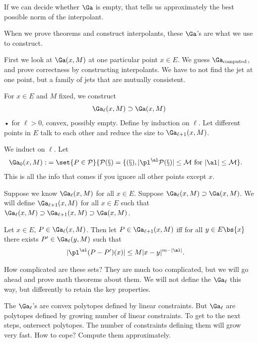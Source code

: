 If we can decide whether $\Ga$ is empty, that tells us approximately the best possible norm of the interpolant.

When we prove theorems and construct interpolants, these $\Ga$'s are what we use to construct. 

First we look at $\Ga(x,M)$ at one particular point $x\in E$. We guess $\Ga_{\text{computed}}$, and prove correctness by constructing interpolants. We have to not find the jet at one point, but a family of jets that are mutually consistent.

For $x\in E$ and $M$ fixed, we construct
\begin{align}
\Ga_\ell(x,M)\supset \Ga(x,M) 
\end{align}•
for $\ell>0$, convex, possibly empty.
Define by induction on $\ell$. Let different points in $E$ talk to each other and reduce the size to $\Ga_{\ell+1}(x,M)$. 

We induct on $\ell$. Let
\begin{align}
\Ga_0(x,M) :&= \set{P\in \cal P}{P(x)=f(x), |\pl^\al P(x)|\le M\text{ for }|\al|\le M}.
\end{align}
This is all the info that comes if you ignore all other points except $x$.

Suppose we know $\Ga_\ell(x,M)$ for all $x\in E$. Suppose $\Ga_\ell(x,M)\supset \Ga(x,M)$. We will define $\Ga_{\ell+1}(x,M)$ for all $x\in E$ such that $\Ga_\ell(x,M)\supset \Ga_{\ell+1}(x,M)\supset \Ga(x,M)$. 

Let $x\in E$, $P\in \Ga_\ell(x,M)$. Then let $P\in \Ga_{\ell+1}(x,M)$ iff for all $y\in E\bs \{x\}$ there exists $P'\in \Ga_\ell(y,M)$ such that 
\begin{align}
|\pl^\al(P-P')(x)| &\le M |x-y|^{m-|\al|}.
\end{align}

How complicated are these sets? They are much too complicated, but we will go ahead and prove math theorems about them. We will not define the $\Ga_\ell$ this way, but differently to retain the key properties.

The $\Ga_\ell$'s are convex polytopes defined by linear constraints. But $\Ga_\ell$ are polytopes defined by growing number of linear constraints. To get to the next steps, ontersect polytopes. The number of constraints defining them will grow very fast.
How to cope?
Compute them approximately. 

